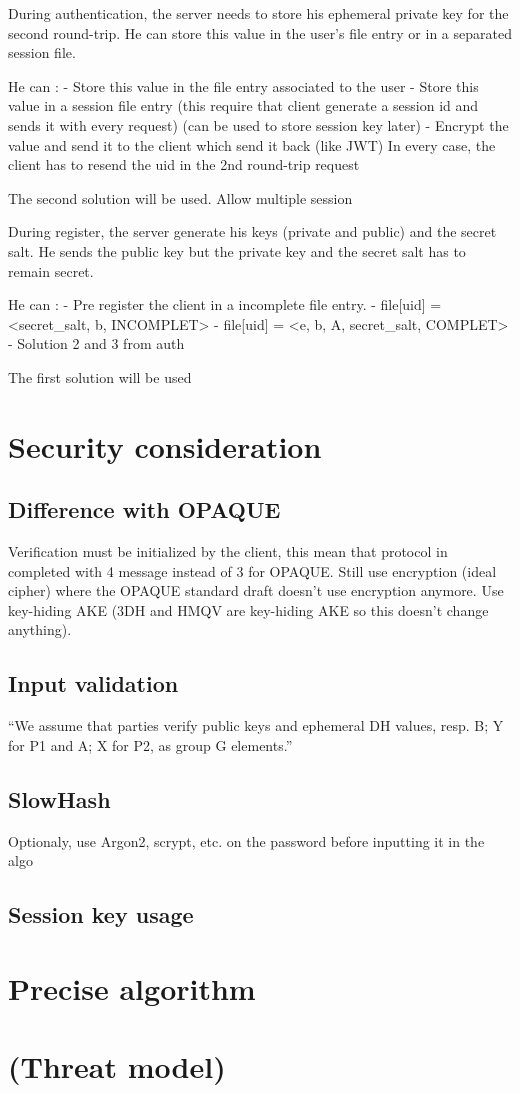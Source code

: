 \documentclass[../report.tex]{subfiles}
\begin{document}
During authentication, the server needs to store his ephemeral private key for the second round-trip. He can store this value in the user's file entry or in a separated session file.

He can :
- Store this value in the file entry associated to the user
- Store this value in a session file entry (this require that client generate a session id and sends it with every request) (can be used to store session key later)
- Encrypt the value and send it to the client which send it back (like JWT)
In every case, the client has to resend the uid in the 2nd round-trip request

The second solution will be used. Allow multiple session
 


During register, the server generate his keys (private and public) and the secret salt. He sends the public key but the private key and the secret salt has to remain secret.

He can :
- Pre register the client in a incomplete file entry.
   - file[uid] = <secret\_salt, b, INCOMPLET>
   - file[uid] = <e, b, A, secret\_salt, COMPLET>
- Solution 2 and 3 from auth

The first solution will be used




\section{Security consideration}

\subsection{Difference with OPAQUE} %

Verification must be initialized by the client, this mean that protocol in completed with 4 message instead of 3 for OPAQUE.
Still use encryption (ideal cipher) where the OPAQUE standard draft doesn't use encryption anymore.
Use key-hiding AKE (3DH and HMQV are key-hiding AKE so this doesn't change anything).

\subsection{Input validation}
``We assume that parties verify public keys and ephemeral DH values, resp.
B; Y for P1 and A; X for P2, as group G elements.''

\subsection{SlowHash}
Optionaly, use Argon2, scrypt, etc. on the password before inputting it in the algo

\subsection{Session key usage}


\section{Precise algorithm}

\section{(Threat model)}
\end{document}
